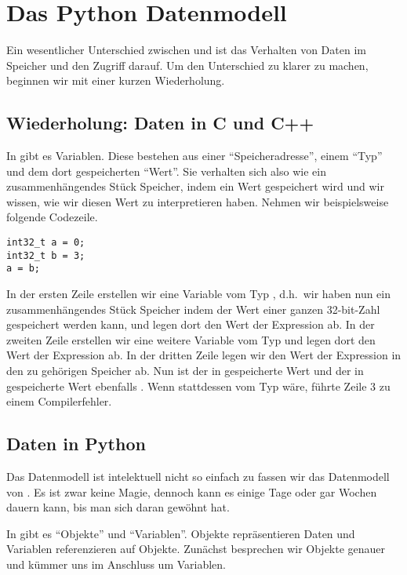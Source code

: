 \section{Das Python Datenmodell}
\label{section:datamodel}
Ein wesentlicher Unterschied zwischen \CC und \Python ist das Verhalten von Daten im Speicher und den Zugriff darauf.
Um den Unterschied zu \CC klarer zu machen, beginnen wir mit einer kurzen Wiederholung.


\subsection{Wiederholung: Daten in C und C++}
\label{section:datamodel:cc}
In \CC gibt es Variablen.
Diese bestehen aus einer ``Speicheradresse'', einem ``Typ'' und dem dort gespeicherten ``Wert''.
Sie verhalten sich also wie ein zusammenhängendes Stück Speicher, indem ein Wert gespeichert wird und wir wissen, wie wir diesen Wert zu interpretieren haben.
Nehmen wir beispielsweise folgende Codezeile.
\begin{lstlisting}[style=CPP]
int32_t a = 0;
int32_t b = 3;
a = b;
\end{lstlisting}
In der ersten Zeile erstellen wir eine Variable vom Typ , d.h.\ wir haben nun ein zusammenhängendes Stück Speicher indem der Wert einer ganzen 32-bit-Zahl gespeichert werden kann,
und legen dort den Wert der Expression  ab.
In der zweiten Zeile erstellen wir eine weitere Variable vom Typ  und legen dort den Wert der Expression  ab.
In der dritten Zeile legen wir den Wert der Expression  in den zu  gehörigen Speicher ab.
Nun ist der in  gespeicherte Wert  und der in  gespeicherte Wert ebenfalls .
Wenn  stattdessen vom Typ  wäre, führte Zeile 3 zu einem Compilerfehler.


\subsection{Daten in Python}
\label{section:datamodel:python}
Das \Python Datenmodell ist intelektuell nicht so einfach zu fassen wir das Datenmodell von \CC.
Es ist zwar keine Magie, dennoch kann es einige Tage oder gar Wochen dauern kann, bis man sich daran gewöhnt hat.

In \Python gibt es ``Objekte'' und ``Variablen''.
Objekte repräsentieren Daten und Variablen referenzieren auf Objekte.
Zunächst besprechen wir Objekte genauer und kümmer uns im Anschluss um Variablen.


